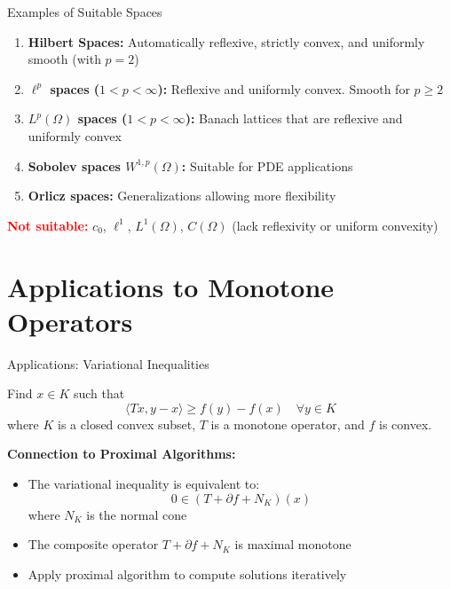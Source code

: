 \documentclass[aspectratio=169,10pt]{beamer}
\begin{document}
\begin{frame}{Examples of Suitable Spaces}
    \begin{enumerate}
        \item \textbf{Hilbert Spaces:} Automatically reflexive, strictly convex,
              and uniformly smooth (with $p=2$)

        \item \textbf{$\ell^p$ spaces ($1 < p < \infty$):} Reflexive and uniformly convex.
              Smooth for $p \geq 2$

        \item \textbf{$L^p(\Omega)$ spaces ($1 < p < \infty$):} Banach lattices that are
              reflexive and uniformly convex

        \item \textbf{Sobolev spaces $W^{1,p}(\Omega)$:} Suitable for PDE applications

        \item \textbf{Orlicz spaces:} Generalizations allowing more flexibility
    \end{enumerate}

    \vspace{0.3cm}
    \textcolor{red}{\textbf{Not suitable:}} $c_0$, $\ell^1$, $L^1(\Omega)$, $C(\Omega)$
    (lack reflexivity or uniform convexity)
\end{frame}

\section{Applications to Monotone Operators}

\begin{frame}{Applications: Variational Inequalities}
    \begin{problem}
        Find $x \in K$ such that
        \[
            \langle Tx, y - x \rangle \geq f(y) - f(x) \quad \forall y \in K
        \]
        where $K$ is a closed convex subset, $T$ is a monotone operator, and $f$ is convex.
    \end{problem}

    \vspace{0.3cm}
    \textbf{Connection to Proximal Algorithms:}
    \begin{itemize}
        \item The variational inequality is equivalent to:
        \[
            0 \in (T + \partial f + N_K)(x)
        \]
        where $N_K$ is the normal cone

        \item The composite operator $T + \partial f + N_K$ is maximal monotone

        \item Apply proximal algorithm to compute solutions iteratively
    \end{itemize}
\end{frame}
\end{document}
